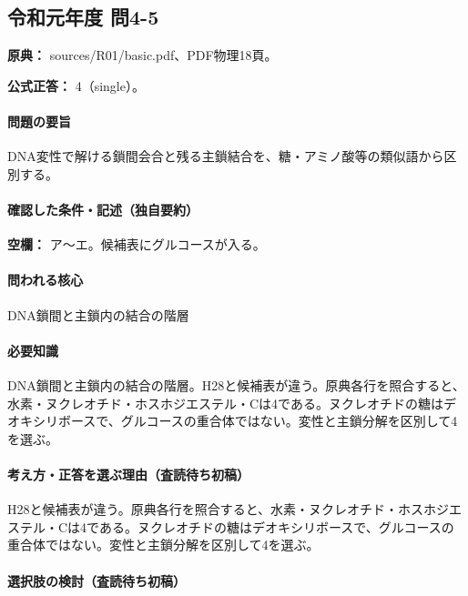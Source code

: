 \subsection{令和元年度 問4-5}
\label{q:r01-reg-basic-4-5}

\noindent\textbf{原典：} sources/R01/basic.pdf、PDF物理18頁。

\textbf{公式正答：} 4（single）。

\paragraph{問題の要旨} DNA変性で解ける鎖間会合と残る主鎖結合を、糖・アミノ酸等の類似語から区別する。

\paragraph{確認した条件・記述（独自要約）}\mbox{}\par

\noindent\textbf{空欄：} ア〜エ。候補表にグルコースが入る。\par

\paragraph{問われる核心} DNA鎖間と主鎖内の結合の階層

\paragraph{必要知識} DNA鎖間と主鎖内の結合の階層。H28と候補表が違う。原典各行を照合すると、水素・ヌクレオチド・ホスホジエステル・Cは4である。ヌクレオチドの糖はデオキシリボースで、グルコースの重合体ではない。変性と主鎖分解を区別して4を選ぶ。

\paragraph{考え方・正答を選ぶ理由（査読待ち初稿）} H28と候補表が違う。原典各行を照合すると、水素・ヌクレオチド・ホスホジエステル・Cは4である。ヌクレオチドの糖はデオキシリボースで、グルコースの重合体ではない。変性と主鎖分解を区別して4を選ぶ。

\paragraph{選択肢の検討（査読待ち初稿）}\mbox{}\par

